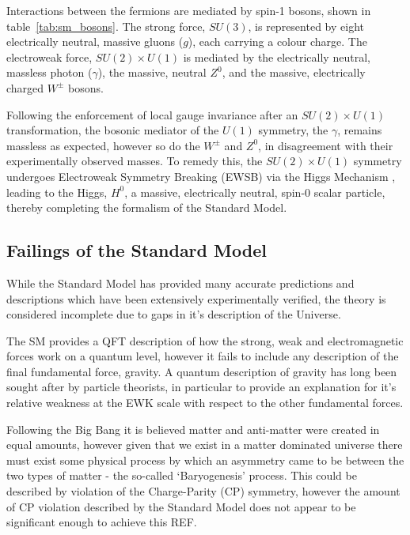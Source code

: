 Interactions between the fermions are mediated by spin-1 bosons, shown in
table~\ref{tab:sm_bosons}. The strong 
force, $SU(3)$, is represented by eight electrically neutral, massive gluons 
($g$), each carrying a colour charge. The electroweak force, $SU(2)\times U(1)$
is
mediated by the electrically neutral, massless photon ($\gamma$), the massive,
neutral $Z^0$, and the massive, electrically charged $W^{\pm}$ bosons.

Following the enforcement of local gauge invariance after an
$SU(2)\times U (1)$ transformation,
the bosonic mediator of the $U(1)$ symmetry, the $\gamma$, remains massless as
expected, however so do the $W^{\pm}$ and $Z^0$, in disagreement with their
experimentally observed masses. To remedy this, the $SU(2)\times U(1)$ symmetry
undergoes Electroweak Symmetry Breaking (EWSB) via the Higgs Mechanism
\cite{PhysRevLett.13.321,PhysRevLett.13.508,PhysRevLett.13.585}, 
leading to the Higgs, $H^0$, a massive, electrically neutral, spin-0
scalar particle, thereby completing the formalism of the Standard Model.



\subsection{Failings of the Standard Model}

While the Standard Model has provided many accurate predictions and descriptions
which have been extensively experimentally verified, the theory is considered
incomplete due to gaps in it's description of the Universe.

The SM provides a QFT description of how the strong, weak and electromagnetic
forces work on a quantum level, however it fails to include any description of
the final fundamental force, gravity. A quantum description of gravity has long
been sought after by particle theorists, in particular to provide an explanation
for it's relative weakness at the EWK scale with respect to the other
fundamental forces.

Following the Big Bang it is believed matter and anti-matter were created in
equal amounts, however given that we exist in a matter dominated universe there
must exist some physical process by which an asymmetry came to be between the
two types of matter - the so-called `Baryogenesis' process. This could
be described by violation of the Charge-Parity (CP) symmetry,
however the amount of CP violation described by the Standard Model
does not appear to be significant enough to achieve this REF.

